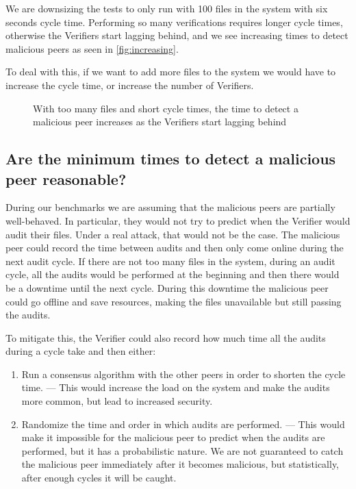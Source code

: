 We are downsizing the tests to only run with 100 files in the system with six seconds cycle time.
Performing so many verifications requires longer cycle times, otherwise the Verifiers start lagging
behind, and we see increasing times to detect malicious peers as seen in \autoref{fig:increasing}.

To deal with this, if we want to add more files to the system we would have to increase the
cycle time, or increase the number of Verifiers.

\begin{figure}
  \centering
  \caption{With too many files and short cycle times, the time to detect a malicious peer increases as the
  Verifiers start lagging behind}
  \label{fig:increasing}
\end{figure}

\subsection{Are the minimum times to detect a malicious peer reasonable?}

During our benchmarks we are assuming that the malicious peers are partially well-behaved.
In particular, they would not try to predict when the Verifier would audit their files.
Under a real attack, that would not be the case.
The malicious peer could record the time between audits and then only come online during the next audit cycle.
If there are not too many files in the system, during an audit cycle, all the audits would be performed
at the beginning and then there would be a downtime until the next cycle.
During this downtime the malicious peer could go offline and save resources, making the
files unavailable but still passing the audits.

To mitigate this, the Verifier could also record how much time all the audits during a cycle take
and then either:
\begin{enumerate}
  \item Run a consensus algorithm with the other peers in order to shorten the cycle time. ---
    This would increase the load on the system and make the audits more common, but lead to increased security.
  \item Randomize the time and order in which audits are performed. --- This would make it impossible for the
    malicious peer to predict when the audits are performed, but it has a probabilistic nature. We are not
    guaranteed to catch the malicious peer immediately after it becomes malicious, but statistically,
    after enough cycles it will be caught.
\end{enumerate}

